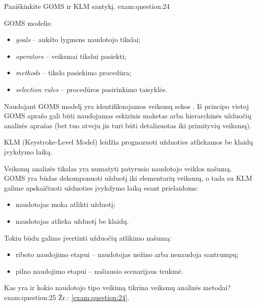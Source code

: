 \begin{question}{%
  Paaiškinkite GOMS ir KLM santykį.
  }{exam:question:24}
  
  GOMS modelis\cite[14]{skaidres-8}:
  \begin{itemize}
    \item \emph{goals} – aukšto lygmens naudotojo tikslai;
    \item \emph{operators} – veiksmai tikslui pasiekti;
    \item \emph{methods} – tikslo pasiekimo procedūra;
    \item \emph{selection rules} – procedūros pasirinkimo taisyklės.
  \end{itemize}
  Naudojant GOMS modelį yra identifikuojamos veiksmų sekos
  \cite[15]{skaidres-8}. Iš principo vietoj GOMS aprašo gali būti
  naudojamas eskizinis maketas arba hierarchinės užduočių analizės
  aprašas (bet tuo atveju jis turi būti detalizuotas iki primityvių
  veiksmų).

  KLM (Keystroke-Level Model) leidžia prognozuoti užduoties atliekamos
  be klaidų įvykdymo laiką. 

  Veiksmų analizės tikslas yra numatyti patyrusio naudotojo veiklos
  našumą. GOMS yra būdas dekomponuoti užduotį iki elementarių veiksmų,
  o tada su KLM galime apskaičiuoti užduoties įvykdymo laiką esant
  prielaidoms\cite[40]{skaidres-8}:
  \begin{itemize}
    \item naudotojas moka atlikti užduotį;
    \item naudotojas atlieka užduotį be klaidų.
  \end{itemize}
  Tokiu būdu galime įvertinti užduočių atlikimo našumą:
  \begin{itemize}
    \item riboto naudojimo etapui – naudotojas nežino arba nenaudoja
      santrumpų;
    \item pilno naudojimo etapui – našiausio scenarijaus trukmė.
  \end{itemize}
\end{question}

\begin{question}{%
  Kas yra ir kokio naudotojo tipo veikimą tikrina veiksmų analizės metodai?
  }{exam:question:25}
  Žr.: \ref{exam:question:24}.
\end{question}

